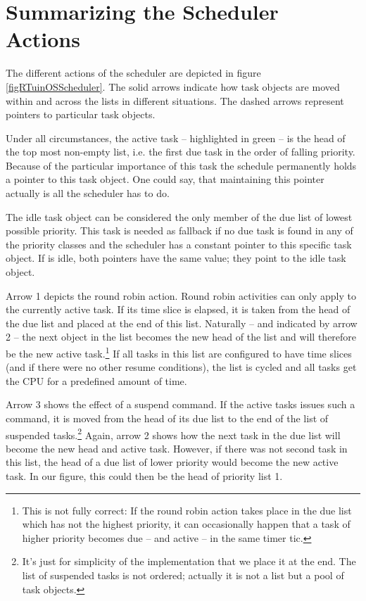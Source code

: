 \section{Summarizing the Scheduler Actions}


The different actions of the scheduler are depicted in figure
\ref{figRTuinOSScheduler}. The solid arrows indicate how task objects are
moved within and across the lists in different situations. The dashed
arrows represent pointers to particular task objects.

Under all circumstances, the active task -- highlighted in green -- is the
head of the top most non-empty list, i.e. the first due task in the order
of falling priority. Because of the particular importance of this task the
schedule permanently holds a pointer to this task object. One could say,
that maintaining this pointer actually is all the scheduler has to do.

The idle task object can be considered the only member of the due list of
lowest possible priority. This task is needed as fallback if no due task
is found in any of the priority classes and the scheduler has a constant
pointer to this specific task object. If \rtos{} is idle, both pointers have
the same value; they point to the idle task object.

Arrow 1 depicts the round robin action. Round robin activities can only
apply to the currently active task. If its time slice is elapsed, it is
taken from the head of the due list and placed at the end of this list.
Naturally -- and indicated by arrow 2 -- the next object in the list
becomes the new head of the list and will therefore be the new active
task.\footnote{This is not fully correct: If the round robin action takes
place in the due list which has not the highest priority, it can
occasionally happen that a task of higher priority becomes due -- and
active -- in the same timer tic.} If all tasks in this list are configured
to have time slices (and if there were no other resume conditions), the
list is cycled and all tasks get the CPU for a predefined amount of time.

Arrow 3 shows the effect of a suspend command. If the active tasks issues
such a command, it is moved from the head of its due list to the end of
the list of suspended tasks.\footnote{It's just for simplicity of the
implementation that we place it at the end. The list of suspended tasks is
not ordered; actually it is not a list but a pool of task objects.} Again,
arrow 2 shows how the next task in the due list will become the new head
and active task. However, if there was not second task in this list, the
head of a due list of lower priority would become the new active task. In
our figure, this could then be the head of priority list 1.

